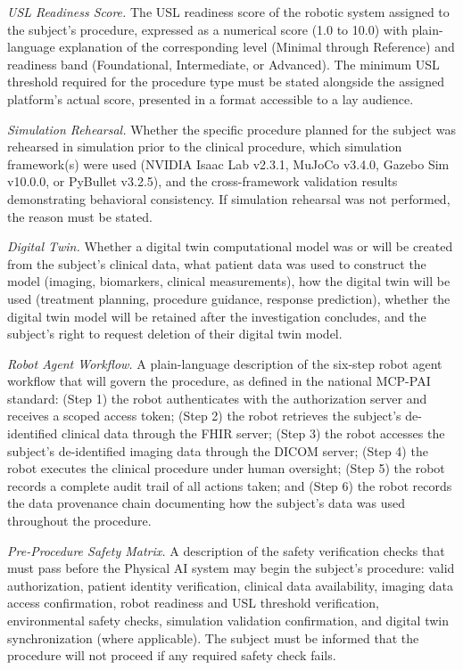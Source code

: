 \documentclass[11pt]{article}
\begin{document}
\begin{description}[leftmargin=1.0cm,style=sameline]
\item[(1)] \textit{USL Readiness Score.} The USL readiness score of the robotic system assigned to the subject's procedure, expressed as a numerical score (1.0 to 10.0) with plain-language explanation of the corresponding level (Minimal through Reference) and readiness band (Foundational, Intermediate, or Advanced). The minimum USL threshold required for the procedure type must be stated alongside the assigned platform's actual score, presented in a format accessible to a lay audience.

\item[(2)] \textit{Simulation Rehearsal.} Whether the specific procedure planned for the subject was rehearsed in simulation prior to the clinical procedure, which simulation framework(s) were used (NVIDIA Isaac Lab v2.3.1, MuJoCo v3.4.0, Gazebo Sim v10.0.0, or PyBullet v3.2.5), and the cross-framework validation results demonstrating behavioral consistency. If simulation rehearsal was not performed, the reason must be stated.

\item[(3)] \textit{Digital Twin.} Whether a digital twin computational model was or will be created from the subject's clinical data, what patient data was used to construct the model (imaging, biomarkers, clinical measurements), how the digital twin will be used (treatment planning, procedure guidance, response prediction), whether the digital twin model will be retained after the investigation concludes, and the subject's right to request deletion of their digital twin model.

\item[(4)] \textit{Robot Agent Workflow.} A plain-language description of the six-step robot agent workflow that will govern the procedure, as defined in the national MCP-PAI standard: (Step 1) the robot authenticates with the authorization server and receives a scoped access token; (Step 2) the robot retrieves the subject's de-identified clinical data through the FHIR server; (Step 3) the robot accesses the subject's de-identified imaging data through the DICOM server; (Step 4) the robot executes the clinical procedure under human oversight; (Step 5) the robot records a complete audit trail of all actions taken; and (Step 6) the robot records the data provenance chain documenting how the subject's data was used throughout the procedure.

\item[(5)] \textit{Pre-Procedure Safety Matrix.} A description of the safety verification checks that must pass before the Physical AI system may begin the subject's procedure: valid authorization, patient identity verification, clinical data availability, imaging data access confirmation, robot readiness and USL threshold verification, environmental safety checks, simulation validation confirmation, and digital twin synchronization (where applicable). The subject must be informed that the procedure will not proceed if any required safety check fails.


\end{description}
\end{document}
